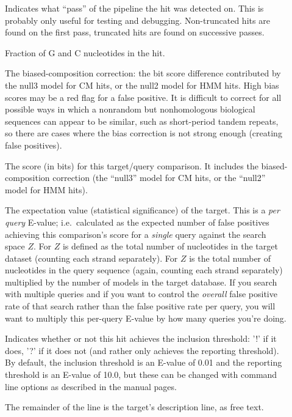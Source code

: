 \begin{description}
\item[] 
  Indicates what ``pass'' of the pipeline the hit was detected
  on. This is probably only useful for testing and
  debugging. Non-truncated hits are found on the first pass, truncated
  hits are found on successive passes.

\item[] 
  Fraction of G and C nucleotides in the hit. 

\item[] The biased-composition correction: the bit
  score difference contributed by the null3 model for CM hits, or the
  null2 model for HMM hits. High bias scores may be a red flag for a
  false positive. It is difficult to correct for all possible ways in
  which a nonrandom but nonhomologous biological sequences can appear
  to be similar, such as short-period tandem repeats, so there are
  cases where the bias correction is not strong enough (creating false
  positives).

\item[]
  The score (in bits) for this target/query comparison. It includes
  the biased-composition correction (the ``null3'' model for CM hits,
  or the ``null2'' model for HMM hits). 

\item[] The expectation value (statistical
  significance) of the target.  This is a \emph{per query} E-value;
  i.e.\ calculated as the expected number of false positives achieving
  this comparison's score for a \emph{single} query against the search
  space $Z$. For  $Z$ is defined as the total number of
  nucleotides in the target dataset (counting each strand
  separately). For  $Z$ is the total number of
  nucleotides in the query sequence (again, counting each strand
  separately) multiplied by the number of models in the target
  database. If you search with multiple queries and if you want to
  control the \emph{overall} false positive rate of that search rather
  than the false positive rate per query, you will want to multiply
  this per-query E-value by how many queries you're doing.

\item[] 
  Indicates whether or not this hit achieves the inclusion threshold:
  '!' if it does, '?' if it does not (and rather only achieves the
  reporting threshold). By default, the inclusion threshold is an
  E-value of 0.01 and the reporting threshold is an E-value of 10.0,
  but these can be changed with command line options as described in
  the manual pages.

\item[] 
  The remainder of the line is the target's description line, as free text.
\end{description}

